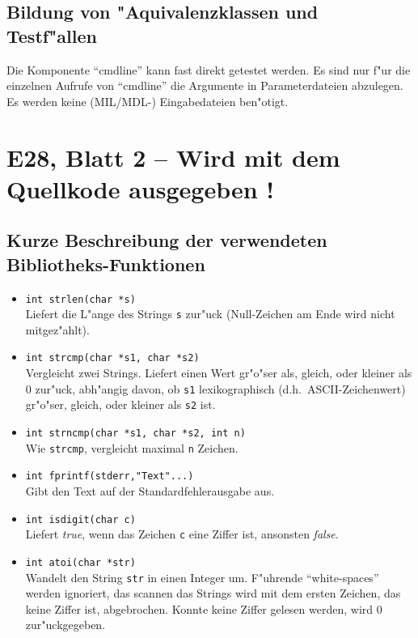 \subsection*{Bildung von "Aquivalenzklassen und Testf"allen}

Die Komponente "`cmdline"' kann fast direkt getestet werden. Es sind nur
f"ur die einzelnen Aufrufe von "`cmdline"' die Argumente in 
Parameterdateien abzulegen. Es werden keine (MIL/MDL-) Eingabedateien
ben"otigt.

\newpage
\section*{E28, Blatt 2 -- Wird mit dem Quellkode ausgegeben !}

\subsection*{Kurze Beschreibung der verwendeten Bibliotheks-Funktionen}

\begin{itemize}
   \item {\tt int strlen(char *s)}\\
      Liefert die L"ange des Strings {\tt s}
      zur"uck (Null-Zeichen am Ende wird nicht mitgez"ahlt).
   \item {\tt int strcmp(char *s1, char *s2)}\\
      Vergleicht zwei Strings. Liefert einen Wert gr"o"ser als, gleich, oder
      kleiner als 0 zur"uck, abh"angig davon, ob {\tt s1} lexikographisch
      (d.h.~ASCII-Zeichenwert) gr"o"ser, gleich, oder
      kleiner als {\tt s2} ist.
   \item {\tt int strncmp(char *s1, char *s2, int n)}\\
      Wie {\tt strcmp}, vergleicht maximal {\tt n} Zeichen.
   \item {\tt int fprintf(stderr,"Text"...)}\\
      Gibt den Text auf der Standardfehlerausgabe aus.
   \item {\tt int isdigit(char c)}\\
      Liefert {\em true\/}, wenn das Zeichen {\tt c} eine Ziffer ist,
      ansonsten {\em false\/}.
   \item {\tt int atoi(char *str)}\\
      Wandelt den String {\tt str} in einen Integer um. F"uhrende
      "`white-spaces"' werden ignoriert, das scannen das Strings wird mit dem
      ersten Zeichen, das keine Ziffer ist, abgebrochen. Konnte keine Ziffer
      gelesen werden, wird 0 zur"uckgegeben.
\end{itemize}
